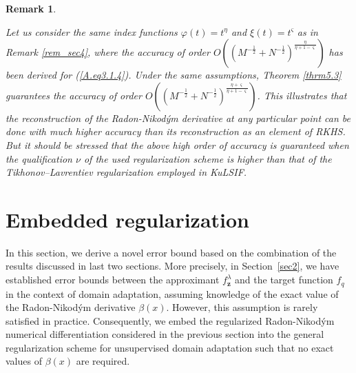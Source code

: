 \documentclass[USenglish]{article}
\newcommand{\bz}{\mathbf{z}}
\newtheorem{remark}{Remark}
\begin{document}
\begin{remark}\label{rem5.4}
 
 Let us consider the same index functions $\varphi (t) = t^\eta$ and $\xi (t)= t^\varsigma$ as in Remark \ref{rem_sec4}, where the accuracy of order $O \left((M^{-\frac12} + N^{-\frac12})^\frac{\eta }{\eta +1 - \varsigma } \right)$ has been derived for (\ref{A.eq3.1.4}). Under the same assumptions, Theorem \ref{thrm5.3} guarantees the accuracy of order $O \left((M^{-\frac12} + N^{-\frac12})^\frac{\eta +\varsigma}{\eta +1 - \varsigma } \right)$.  This illustrates that the reconstruction of the Radon-Nikod\'ym derivative at any particular point can be done with much higher accuracy than its reconstruction as an element of RKHS.
But it should be stressed that the above high order of accuracy is guaranteed when the qualification $\nu$ of the used regularization scheme is higher than that of the Tikhonov–Lavrentiev regularization employed in KuLSIF.
\end{remark}

\section{Embedded regularization}
\label{sec:embedded_regularization}
In this section, we derive a novel error bound based on the combination of the results discussed in last two sections.
More precisely, in Section~\ref{sec2}, we have established  error bounds between the approximant $f_\bz^\lambda$ and the target function $f_q$ in the context of domain adaptation, assuming knowledge of the exact value of the Radon-Nikod\'ym derivative $\beta (x)$.
However, this assumption is rarely satisfied in practice.
Consequently, we embed the regularized Radon-Nikod\'ym numerical differentiation 
considered in the previous section 
into the general regularization scheme for unsupervised domain adaptation such that no exact values of $\beta (x)$ are required. 
\end{document}
